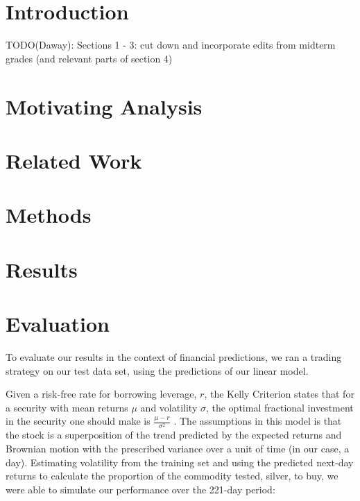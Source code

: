 \documentclass{article}
\begin{document}
\section{Introduction}

TODO(Daway): Sections 1 - 3: cut down and incorporate edits from midterm grades (and relevant parts of section 4)


 
\section{Motivating Analysis}



\section{Related Work}



\section{Methods}



\section{Results}



\section{Evaluation}

To evaluate our results in the context of financial predictions, we ran a trading strategy on our test data set, using the predictions of our linear model.

Given a risk-free rate for borrowing leverage, $r$, the Kelly Criterion states that for a security with mean returns $\mu$ and volatility $\sigma$, the optimal fractional investment in the security one should make is $\frac{\mu-r}{\sigma^2}$ \cite{davis2012fractional}. The assumptions in this model is that the stock is a superposition of the trend predicted by the expected returns and Brownian motion with the prescribed variance over a unit of time (in our case, a day). Estimating volatility from the training set and using the predicted next-day returns to calculate the proportion of the commodity tested, silver, to buy, we were able to simulate our performance over the 221-day period:
\end{document}
